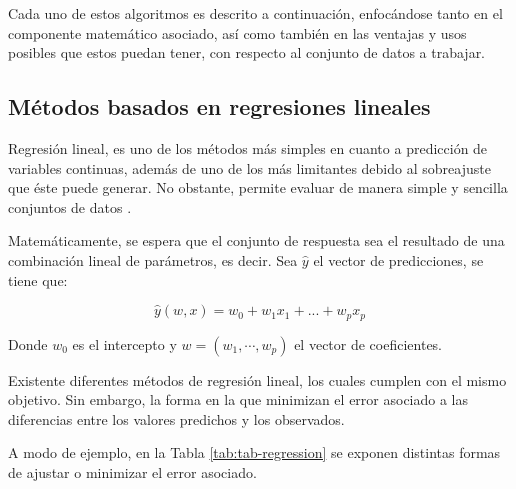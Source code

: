 Cada uno de estos algoritmos es descrito a continuación, enfocándose tanto en el componente matemático asociado, así como también en las ventajas y usos posibles que estos puedan tener, con respecto al conjunto de datos a trabajar.

\subsection{Métodos basados en regresiones lineales}

Regresión lineal, es uno de los métodos más simples en cuanto a predicción de variables continuas, además de uno de los más limitantes debido al sobreajuste que éste puede generar. No obstante, permite evaluar de manera simple y sencilla conjuntos de datos \cite{graybill1976theory}. 

Matemáticamente, se espera que el conjunto de respuesta sea el resultado de una combinación lineal de parámetros, es decir. Sea $\hat{y}$ el vector de predicciones, se tiene que:

\begin{equation}
	\hat{y}(w, x) = w_0 + w_1 x_1 + ... + w_p x_p
\end{equation}

Donde $w_0$ es el intercepto y $w = (w_1,\cdots, w_p)$ el vector de coeficientes.

Existente diferentes métodos de regresión lineal, los cuales cumplen con el mismo objetivo. Sin embargo, la forma en la que minimizan el error asociado a las diferencias entre los valores predichos y los observados.

A modo de ejemplo, en la Tabla \ref{tab:tab-regression} se exponen distintas formas de ajustar o minimizar el error asociado.

